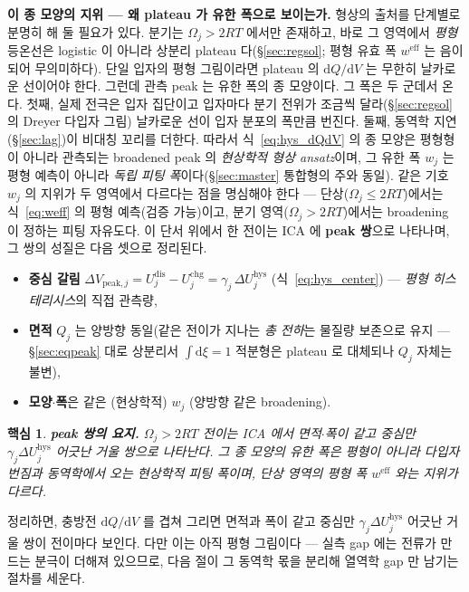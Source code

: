 \documentclass[11pt,a4paper]{article}
\newtheorem*{keybox}{핵심}
\newcommand{\dd}{\mathrm{d}}
\newcommand{\eff}{\mathrm{eff}}
\newcommand{\dis}{\mathrm{dis}}
\newcommand{\chg}{\mathrm{chg}}
\newcommand{\hys}{\mathrm{hys}}
\begin{document}
\textbf{이 종 모양의 지위 — 왜 plateau 가 유한 폭으로 보이는가.} 형상의 출처를 단계별로 분명히 해 둘 필요가
있다. 분기는 $\Omega_j>2RT$ 에서만 존재하고, 바로 그 영역에서 \emph{평형} 등온선은 logistic 이 아니라 상분리
plateau 다(\S\ref{sec:regsol}; 평형 유효 폭 $w^\eff$ 는 음이 되어 무의미하다). 단일 입자의 평형 그림이라면
plateau 의 $\dd Q/\dd V$ 는 무한히 날카로운 선이어야 한다. 그런데 관측 peak 는 유한 폭의 종 모양이다. 그 폭은
두 군데서 온다. 첫째, 실제 전극은 입자 집단이고 입자마다 분기 전위가 조금씩 달라(\S\ref{sec:regsol} 의 Dreyer
다입자 그림) 날카로운 선이 입자 분포의 폭만큼 번진다. 둘째, 동역학 지연(\S\ref{sec:lag})이 비대칭 꼬리를
더한다. 따라서 식~\eqref{eq:hys_dQdV} 의 종 모양은 평형형이 아니라 관측되는 broadened peak 의 \emph{현상학적
형상 ansatz}이며, 그 유한 폭 $w_j$ 는 평형 예측이 아니라 \emph{독립 피팅 폭}이다(\S\ref{sec:master} 통합형의
주와 동일). 같은 기호 $w_j$ 의 지위가 두 영역에서 다르다는 점을 명심해야 한다 — 단상($\Omega_j\le2RT$)에서는
식~\eqref{eq:weff} 의 평형 예측(검증 가능)이고, 분기 영역($\Omega_j>2RT$)에서는 broadening 이 정하는 피팅
자유도다. 이 단서 위에서 한 전이는 ICA 에 \textbf{peak 쌍}으로 나타나며, 그 쌍의 성질은 다음 셋으로 정리된다.
\begin{itemize}[leftmargin=1.4em,itemsep=2pt]
\item \textbf{중심 갈림} $\Delta V_{\mathrm{peak},j}=U_j^\dis-U_j^\chg=\gamma_j\,\Delta U_j^\hys$ (식~\eqref{eq:hys_center}) —
  \emph{평형 히스테리시스}의 직접 관측량,
\item \textbf{면적} $Q_j$ 는 양방향 동일(같은 전이가 지나는 \emph{총 전하}는 물질량 보존으로 유지 — \S\ref{sec:eqpeak}
  대로 상분리서 $\int\dd\xi=1$ 적분형은 plateau 로 대체되나 $Q_j$ 자체는 불변),
\item \textbf{모양$\cdot$폭}은 같은 (현상학적) $w_j$ (양방향 같은 broadening).
\end{itemize}
\begin{keybox}
\textbf{peak 쌍의 요지.} $\Omega_j>2RT$ 전이는 ICA 에서 면적$\cdot$폭이 같고 중심만 $\gamma_j\Delta U_j^\hys$
어긋난 거울 쌍으로 나타난다. 그 종 모양의 유한 폭은 평형이 아니라 다입자 번짐과 동역학에서 오는 현상학적
피팅 폭이며, 단상 영역의 평형 폭 $w^\eff$ 와는 지위가 다르다.
\end{keybox}
정리하면, 충방전 $\dd Q/\dd V$ 를 겹쳐 그리면 면적과 폭이 같고 중심만 $\gamma_j\Delta U_j^\hys$ 어긋난 거울
쌍이 전이마다 보인다. 다만 이는 아직 평형 그림이다 — 실측 gap 에는 전류가 만드는 분극이 더해져 있으므로, 다음
절이 그 동역학 몫을 분리해 열역학 gap 만 남기는 절차를 세운다.
\end{document}
